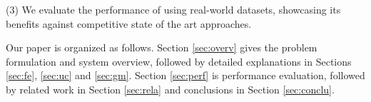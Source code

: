 \stab(3) We evaluate the performance of \sys{} using real-world datasets, showcasing its benefits against competitive state of the art approaches.



Our paper is organized as follows.
Section \ref{sec:overv} gives the problem formulation and system overview, followed by detailed explanations in Sections \ref{sec:fe}, \ref{sec:uc} and \ref{sec:gm}.
Section \ref{sec:perf} is performance evaluation, followed by
related work in Section \ref{sec:rela} and conclusions in Section \ref{sec:conclu}.











